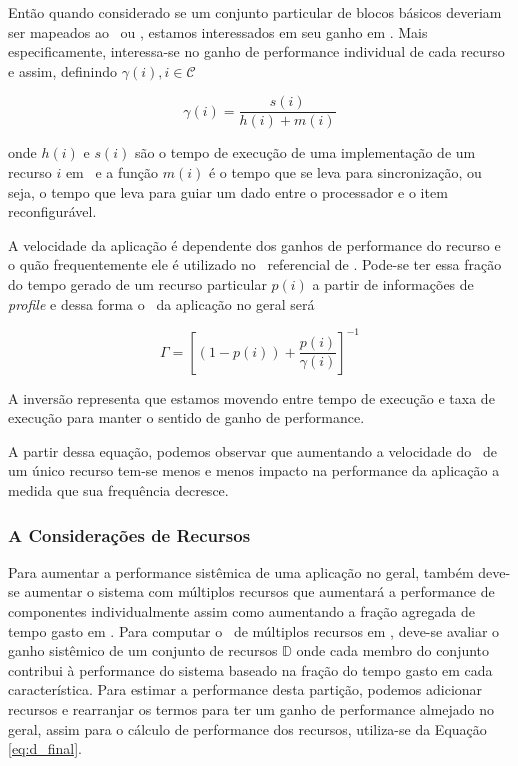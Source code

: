 	Então quando considerado se um conjunto particular de blocos básicos deveriam ser mapeados ao \hardware\ ou \software, estamos interessados em seu ganho em \speedup. Mais especificamente, interessa-se no ganho de performance individual de cada recurso e assim, definindo $ \gamma(i), i \in \mathcal{C} $

	\begin{equation}
    	\gamma(i) = \frac{s(i)}{h(i) + m(i)}
    \end{equation}

	onde $ h(i) $ e $ s(i) $ são o tempo de execução de uma implementação de um recurso $ i $ em \hs\ e a função $ m(i) $ é o tempo que se leva para sincronização, ou seja, o tempo que leva para guiar um dado entre o processador e o item reconfigurável.

    A velocidade da aplicação é dependente dos ganhos de performance do recurso e o quão frequentemente ele é utilizado no \design\ referencial de \software. Pode-se ter essa fração do tempo gerado de um recurso particular $ p(i) $ a partir de informações de \textit{profile} e dessa forma o \speedup\ da aplicação no geral será

	\begin{equation}
    	\Gamma = \left [
        	(1 - p(i))
            	+
            \frac{
            	p(i)
            }{
            	\gamma(i)
            } \right ]^{-1}
    \end{equation}

	A inversão representa que estamos movendo entre tempo de execução e taxa de execução para manter o sentido de ganho de performance.

	A partir dessa equação, podemos observar que aumentando a velocidade do \hardware\ de um único recurso tem-se menos e menos impacto na performance da aplicação a medida que sua frequência decresce.
    
	\subsubsection{A Considerações de Recursos} \label{sec:recursos}

    Para aumentar a performance sistêmica de uma aplicação no geral, também deve-se aumentar o sistema com múltiplos recursos que aumentará a performance de componentes individualmente assim como aumentando a fração agregada de tempo gasto em \hardware.
    Para computar o \speedup\ de múltiplos recursos em \hardware, deve-se avaliar o ganho sistêmico de um conjunto de recursos $ \mathbb{D} $ onde cada membro do conjunto contribui à performance do sistema baseado na fração do tempo gasto em cada característica.
    Para estimar a performance desta partição, podemos adicionar recursos e rearranjar os termos para ter um ganho de performance almejado no geral, assim para o cálculo de performance dos recursos, utiliza-se da Equação \ref{eq:d_final}.

